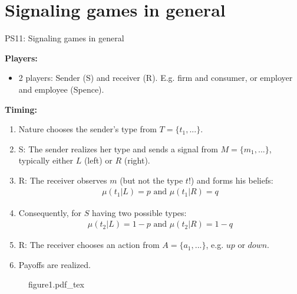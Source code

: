 \section{Signaling games in general}

\begin{frame}{PS11: Signaling games in general}
    \begin{multicols}{2}
      \textbf{Players:}\vspace{-4pt}
      \begin{itemize}
        \item 2 players: Sender (S) and receiver (R). E.g. firm and consumer, or employer and employee (Spence).
      \end{itemize}\vspace{-4pt}
      \textbf{Timing:}\vspace{-4pt}
      \begin{enumerate}
        \item Nature chooses the sender's type from $T=\{t_1,...\}$.
        \item S: The sender realizes her type and sends a signal from $M=\{m_1,...\}$, typically either $L$ (left) or $R$ (right).
        \item R: The receiver observes $m$ (but not the type $t$!) and forms his beliefs:\vspace{-4pt}
        \begin{align*}
          \mu(t_1|L)=p\text{ and }\mu(t_1|R)=q
        \end{align*}
        \item[] \vspace{-4pt} Consequently, for $S$ having two possible types:\vspace{-4pt}
        \begin{align*}
          \mu(t_2|L)=1-p\text{ and }\mu(t_2|R)=1-q
        \end{align*}
        \item \vspace{-4pt} R: The receiver chooses an action from $A=\{a_1,...\}$, e.g. $up$ or $down$.
        \item Payoffs are realized.
      \end{enumerate}
      \vfill\null\columnbreak
      \begin{figure}[!h]
        \center
        \def\svgwidth{\columnwidth}
        {figure1.pdf_tex}
      \end{figure}
      \vfill\null
    \end{multicols}
\end{frame}

